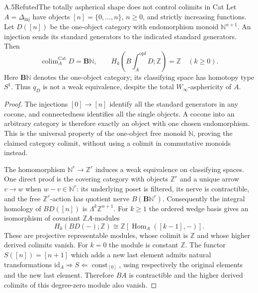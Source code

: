 \begin{result}{A.5}{Refuted}{The totally aspherical shape does not control colimits in Cat}
Let $A=\Delta_{\mathrm{inj}}$ have objects $[n]=\{0,\ldots,n\}$,
$n\geq0$, and strictly increasing functions. Let $D([n])$ be the
one-object category with endomorphism monoid $\mathbb N^{n+1}$.
An injection sends its standard generators to the indicated standard
generators. Then
\[
 \operatorname{colim}_{A}^{\mathrm{Cat}}D=\mathbf B\mathbb N,
 \qquad
 H_k\left(B\int_A^{\mathrm{opf}}D;\mathbb Z\right)=\mathbb Z
       \quad(k\geq0).
\]
Here $\mathbf B\mathbb N$ denotes the one-object category; its
classifying space has homotopy type $S^1$. Thus $q_D$ is not a weak
equivalence, despite the total $W_\infty$-asphericity of $A$.
\end{result}
\begin{proof}
The injections $[0]\to[n]$ identify all the standard generators in
any cocone, and connectedness identifies all the single objects.
A cocone into an arbitrary category is therefore exactly an object
with one chosen endomorphism. This is the universal property of the
one-object free monoid $\mathbb N$, proving the claimed category
colimit, without using a colimit in commutative monoids instead.

The homomorphism $\mathbb N^r\to\mathbb Z^r$ induces a weak
equivalence on classifying spaces. One direct proof is the covering
category with objects $\mathbb Z^r$ and a unique arrow $v\to w$ when
$w-v\in\mathbb N^r$: its underlying poset is filtered, its nerve is
contractible, and the free $\mathbb Z^r$-action has quotient nerve
$B(\mathbf B\mathbb N^r)$. Consequently the integral homology of $BD([n])$ is
$\Lambda^k\mathbb Z^{n+1}$. For $k\geq1$ the ordered wedge basis gives
an isomorphism of covariant $\mathbb Z A$-modules
\[
 H_k(BD(-);\mathbb Z)
   \cong\mathbb Z[\operatorname{Hom}_{A}([k-1],-)].
\]
These are projective representable modules, whose colimit is
$\mathbb Z$ and whose higher derived colimits vanish. For $k=0$ the
module is constant $\mathbb Z$. The functor $S([n])=[n+1]$ which
adds a new last element admits natural transformations
$\mathrm{id}_A\Rightarrow S\Leftarrow\operatorname{const}_{[0]}$,
using respectively the original elements and the new last element.
Therefore $BA$ is contractible and the higher derived colimits of
this degree-zero module also vanish.


\end{proof}
